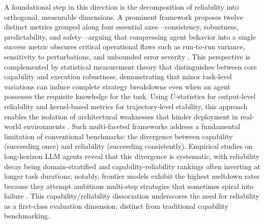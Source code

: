 \documentclass[11pt]{article}
\begin{document}
A foundational step in this direction is the decomposition of reliability into orthogonal, measurable dimensions. A prominent framework proposes twelve distinct metrics grouped along four essential axes---consistency, robustness, predictability, and safety---arguing that compressing agent behavior into a single success metric obscures critical operational flaws such as run-to-run variance, sensitivity to perturbations, and unbounded error severity \cite{ref353}. This perspective is complemented by statistical measurement theory that distinguishes between core capability and execution robustness, demonstrating that minor task-level variations can induce complete strategy breakdowns even when an agent possesses the requisite knowledge for the task. Using \(U\)-statistics for output-level reliability and kernel-based metrics for trajectory-level stability, this approach enables the isolation of architectural weaknesses that hinder deployment in real-world environments \cite{ref391}. Such multi-faceted frameworks address a fundamental limitation of conventional benchmarks: the divergence between capability (succeeding once) and reliability (succeeding consistently). Empirical studies on long-horizon LLM agents reveal that this divergence is systematic, with reliability decay being domain-stratified and capability-reliability rankings often inverting at longer task durations; notably, frontier models exhibit the highest meltdown rates because they attempt ambitious multi-step strategies that sometimes spiral into failure \cite{ref352}. This capability/reliability dissociation underscores the need for reliability as a first-class evaluation dimension, distinct from traditional capability benchmarking.
\end{document}
